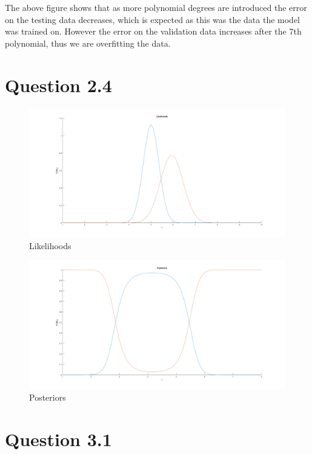 The above figure shows that as more polynomial degrees are introduced the error on the testing data decreases, which is expected as this was the data the model was trained on. However the error on the validation data increases after the 7th polynomial, thus we are overfitting the data.

\section*{Question 2.4}



\begin{figure}[H]
    \includegraphics[width=\linewidth]{../../pracs/week3/images/q4_likelihoods}
    \centering
    \caption{Likelihoods}
\end{figure}

\begin{figure}[H]
    \includegraphics[width=\linewidth]{../../pracs/week3/images/q4_posteriors}
    \centering
    \caption{Posteriors}
\end{figure}

\section*{Question 3.1}

